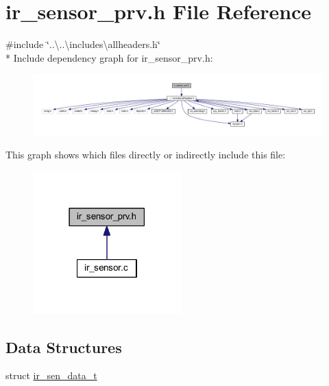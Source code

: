 \hypertarget{a00023}{\section{ir\+\_\+sensor\+\_\+prv.\+h File Reference}
\label{a00023}
}
{\ttfamily \#include \char`\"{}..\textbackslash{}..\textbackslash{}includes\textbackslash{}allheaders.\+h\char`\"{}}\\*
Include dependency graph for ir\+\_\+sensor\+\_\+prv.\+h\+:\nopagebreak
\begin{figure}[H]
\begin{center}
\leavevmode
\includegraphics[width=350pt]{d8/dbb/a00932}
\end{center}
\end{figure}
This graph shows which files directly or indirectly include this file\+:\nopagebreak
\begin{figure}[H]
\begin{center}
\leavevmode
\includegraphics[width=162pt]{d0/d5b/a00933}
\end{center}
\end{figure}
\subsection*{Data Structures}
\begin{DoxyCompactItemize}
\item 
struct \hyperlink{a00023_d6/d21/a00573}{ir\+\_\+sen\+\_\+data\+\_\+t}
\end{DoxyCompactItemize}
